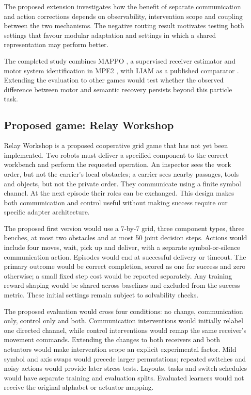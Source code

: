 \documentclass[10pt,a4paper]{article}
\begin{document}
The proposed extension investigates how the benefit of separate communication and action corrections depends on observability, intervention scope and coupling between the two mechanisms. The negative routing result motivates testing both settings that favour modular adaptation and settings in which a shared representation may perform better.

The completed study combines MAPPO \cite{yu2022}, a supervised receiver estimator and motor system identification in MPE2 \cite{mpe2}, with LIAM as a published comparator \cite{papoudakis2021}. Extending the evaluation to other games would test whether the observed difference between motor and semantic recovery persists beyond this particle task.

\subsection{Proposed game: Relay Workshop}

Relay Workshop is a proposed cooperative grid game that has not yet been implemented. Two robots must deliver a specified component to the correct workbench and perform the requested operation. An inspector sees the work order, but not the carrier's local obstacles; a carrier sees nearby passages, tools and objects, but not the private order. They communicate using a finite symbol channel. At the next episode their roles can be exchanged. This design makes both communication and control useful without making success require our specific adapter architecture.

The proposed first version would use a 7-by-7 grid, three component types, three benches, at most two obstacles and at most 50 joint decision steps. Actions would include four moves, wait, pick up and deliver, with a separate symbol-or-silence communication action. Episodes would end at successful delivery or timeout. The primary outcome would be correct completion, scored as one for success and zero otherwise; a small fixed step cost would be reported separately. Any training reward shaping would be shared across baselines and excluded from the success metric. These initial settings remain subject to solvability checks.

The proposed evaluation would cross four conditions: no change, communication only, control only and both. Communication interventions would initially relabel one directed channel, while control interventions would remap the same receiver's movement commands. Extending the changes to both receivers and both actuators would make intervention scope an explicit experimental factor. Mild symbol and axis swaps would precede larger permutations; repeated switches and noisy actions would provide later stress tests. Layouts, tasks and switch schedules would have separate training and evaluation splits. Evaluated learners would not receive the original alphabet or actuator mapping.
\end{document}
